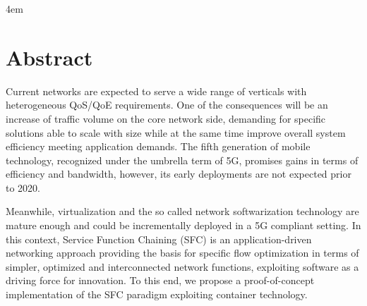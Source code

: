 \cleardoublepage
{}

\vspace*{\fill}

\vspace*{-5cm}

\thispagestyle{empty}

\par
\begingroup
\leftskip4em
\rightskip\leftskip
\section*{\centering Abstract}
Current networks are expected to serve a wide range of verticals with
heterogeneous QoS/QoE requirements. One of the consequences will be an increase
of traffic volume on the core network side, demanding for specific solutions
able to scale with size while at the same time improve overall system
efficiency meeting application demands. The fifth generation of mobile
technology, recognized under the umbrella term of 5G, promises gains in terms
of efficiency and bandwidth, however, its early deployments are not expected
prior to 2020. 

Meanwhile, virtualization and the so called network softwarization technology
are mature enough and could be incrementally deployed in a 5G compliant
setting. In this context, Service Function Chaining (SFC) is an
application-driven networking approach providing the basis for specific flow
optimization in terms of simpler, optimized and interconnected network
functions, exploiting software as a driving force for innovation. To this end,
we propose a proof-of-concept implementation of the SFC paradigm exploiting
container technology.
\par\endgroup
\vspace*{\fill}